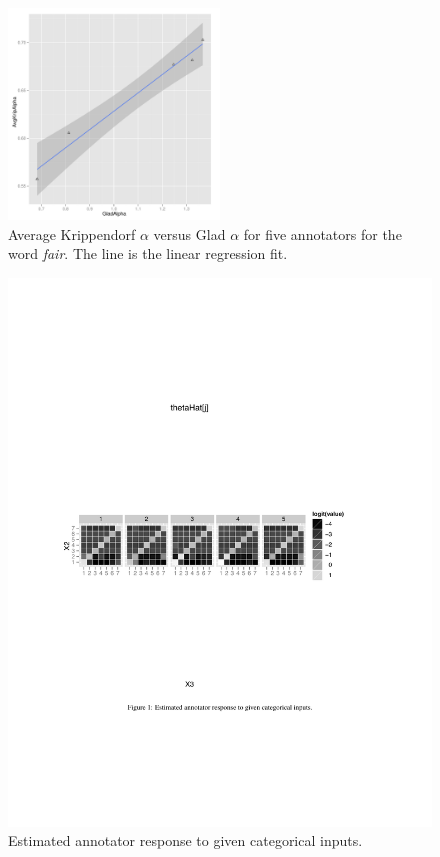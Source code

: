\documentclass[11pt]{article}
\begin{document}

\begin{figure}
\begin{center}
\includegraphics[width=0.5\textwidth]{img/GladVsKripp.pdf}
\end{center}
\caption{Average Krippendorf $\alpha$ versus Glad $\alpha$ for five
annotators for the word {\it fair}.  The line is the linear regression
fit.}
\end{figure}

\begin{figure}
\includegraphics[width=\textwidth]{img/fair-response.pdf}
\caption{Estimated annotator response to given categorical
inputs.}
\end{figure}
\end{document}
